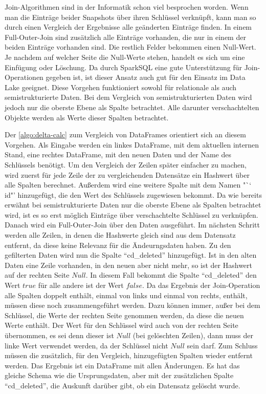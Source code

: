 Join-Algorithmen sind in der Informatik schon viel besprochen worden.
Wenn man die Einträge beider Snapshots über ihren Schlüssel verknüpft, kann man so durch einen Vergleich der Ergebnisse alle geänderten Einträge finden.
In einem Full-Outer-Join sind zusätzlich alle Einträge vorhanden, die nur in einem der beiden Einträge vorhanden sind.
Die restlich Felder bekommen einen Null-Wert.
Je nachdem auf welcher Seite die Null-Werte stehen, handelt es sich um eine Einfügung oder Löschung.
Da durch SparkSQL eine gute Unterstützung für Join-Operationen gegeben ist, ist dieser Ansatz auch gut für den Einsatz im Data Lake geeignet.
Diese Vorgehen funktioniert sowohl für relationale als auch semistrukturierte Daten.
Bei dem Vergleich von semistrukturierten Daten wird jedoch nur die oberste Ebene als Spalte betrachtet.
Alle darunter verschachtelten Objekte werden als Werte dieser Spalten betrachtet.

Der \cref{algo:delta-calc} zum Vergleich von DataFrames orientiert sich an diesem Vorgehen.
Als Eingabe werden ein linkes DataFrame, mit dem aktuellen internen Stand, eine rechtes DataFrame, mit den neuen Daten und der Name des Schlüssels benötigt.
Um den Vergleich der Zeilen später einfacher zu machen, wird zuerst für jede Zeile der zu vergleichenden Datensätze ein Hashwert über alle Spalten berechnet.
Außerdem wird eine weitere Spalte mit dem Namen "`\char`~ id"' hinzugefügt, die den Wert des Schlüssels zugewiesen bekommt.
Da wie bereits erwähnt bei semistrukturierte Daten nur die oberste Ebene als Spalten betrachtet wird, ist es so erst möglich  Einträge über verschachtelte Schlüssel zu verknüpfen.
Danach wird ein Full-Outer-Join über den Daten ausgeführt.
Im nächsten Schritt werden alle Zeilen, in denen die Hashwerte gleich sind aus dem Datensatz entfernt, da diese keine Relevanz für die Ändeurngsdaten haben.
Zu den gefilterten Daten wird nun die Spalte "`cd\_deleted"' hinzugefügt.
Ist in den alten Daten eine Zeile vorhanden, in den neuen aber nicht mehr, so ist der Hashwert auf der rechten Seite $Null$.
In diesem Fall bekommt die Spalte "`cd\_deleted"' den Wert $true$ für alle andere ist der Wert $false$.
Da das Ergebnis der Join-Operation alle Spalten doppelt enthält, einmal von links und einmal von rechts, enthält, müssen diese noch zusammengeführt werden.
Dazu können immer, außer bei dem Schlüssel, die Werte der rechten Seite genommen werden, da diese die neuen Werte enthält.
Der Wert für den Schlüssel wird auch von der rechten Seite übernommen, es sei denn dieser ist $Null$ (bei gelöschten Zeilen), dann muss der linke Wert verwendet werden, da der Schlüssel nicht $Null$ sein darf.
Zum Schluss müssen die zusätzlich, für den Vergleich, hinzugefügten Spalten wieder entfernt werden.
Das Ergebnis ist ein DataFrame mit allen Änderungen.
Es hat das gleiche Schema wie die Ursprungsdaten, aber mit der zusätzlichen Spalte "`cd\_deleted"', die Auskunft darüber gibt, ob ein Datensatz gelöscht wurde.

